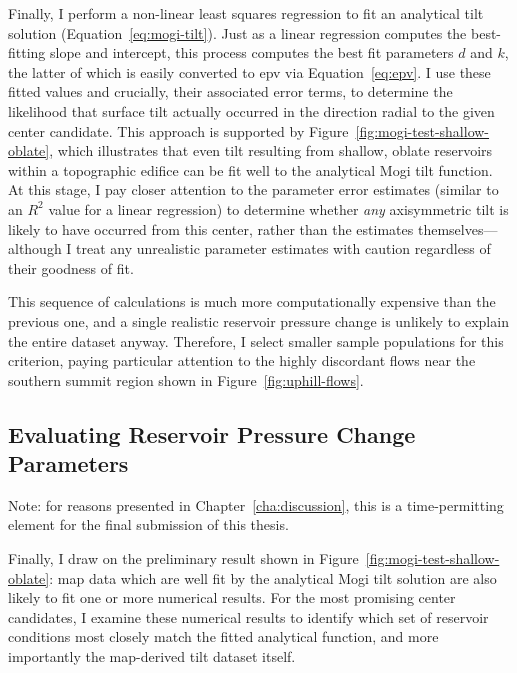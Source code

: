 Finally, I perform a non-linear least squares regression to fit an analytical tilt solution (Equation~\eqref{eq:mogi-tilt}). Just as a linear regression computes the best-fitting slope and intercept, this process computes the best fit parameters $d$ and $k$, the latter of which is easily converted to \acs{epv} via Equation~\eqref{eq:epv}. I use these fitted values and crucially, their associated error terms, to determine the likelihood that surface tilt actually occurred in the direction radial to the given center candidate. This approach is supported by Figure~\ref{fig:mogi-test-shallow-oblate}, which illustrates that even tilt resulting from shallow, oblate reservoirs within a topographic edifice can be fit well to the analytical Mogi tilt function. At this stage, I pay closer attention to the parameter error estimates (similar to an $R^2$ value for a linear regression) to determine whether \emph{any} axisymmetric tilt is likely to have occurred from this center, rather than the estimates themselves---although I treat any unrealistic parameter estimates with caution regardless of their goodness of fit.

This sequence of calculations is much more computationally expensive than the previous one, and a single realistic reservoir pressure change is unlikely to explain the entire dataset anyway. Therefore, I select smaller sample populations for this criterion, paying particular attention to the highly discordant flows near the southern summit region shown in Figure~\ref{fig:uphill-flows}.

\subsection{Evaluating Reservoir Pressure Change Parameters}

Note: for reasons presented in Chapter~\ref{cha:discussion}, this is a time-permitting element for the final submission of this thesis.

Finally, I draw on the preliminary result shown in Figure~\ref{fig:mogi-test-shallow-oblate}: map data which are well fit by the analytical Mogi tilt solution are also likely to fit one or more numerical results. For the most promising center candidates, I examine these numerical results to identify which set of reservoir conditions most closely match the fitted analytical function, and more importantly the map-derived tilt dataset itself.
